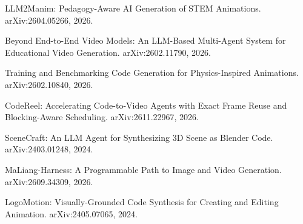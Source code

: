 \begin{refs}
\begin{enumerate}[label={[\arabic*]},leftmargin=2.1em,itemsep=1pt,topsep=2pt]
\item LLM2Manim: Pedagogy-Aware AI Generation of STEM Animations.
  arXiv:2604.05266, 2026.

\item Beyond End-to-End Video Models: An LLM-Based Multi-Agent System for
  Educational Video Generation. arXiv:2602.11790, 2026.

\item Training and Benchmarking Code Generation for Physics-Inspired Animations.
  arXiv:2602.10840, 2026.

\item CodeReel: Accelerating Code-to-Video Agents with Exact Frame Reuse and
  Blocking-Aware Scheduling. arXiv:2611.22967, 2026.

\item SceneCraft: An LLM Agent for Synthesizing 3D Scene as Blender Code.
  arXiv:2403.01248, 2024.

\item MaLiang-Harness: A Programmable Path to Image and Video Generation.
  arXiv:2609.34309, 2026.

\item LogoMotion: Visually-Grounded Code Synthesis for Creating and Editing
  Animation. arXiv:2405.07065, 2024.

\end{enumerate}
\end{refs}
